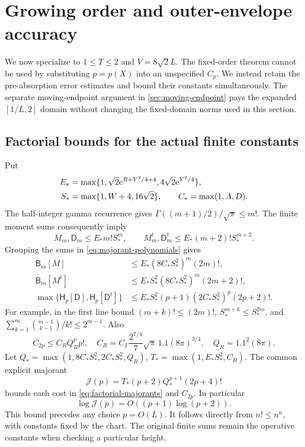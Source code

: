 \section{Growing order and outer-envelope accuracy}
\label{sec:growing}
We now specialize to \(1\le T\le2\) and
\(V=8\sqrt2L\). The fixed-order theorem cannot be used by
substituting \(p=p(X)\) into an unspecified \(C_p\).
We instead retain the pre-absorption error estimates and bound
their constants simultaneously. The separate moving-endpoint argument in
\cref{sec:moving-endpoint} pays the expanded \([1/L,2]\) domain without
changing the fixed-domain norms used in this section.

\subsection{Factorial bounds for the actual finite constants}
Put
\begin{align}
 E_*&=\max\{1,\sqrt2\mathrm e^{R+Y^2/4+4},
                         4\sqrt2\mathrm e^{Y^2/4}\},\\
 S_*&=\max\{1,W+4,16\sqrt2\},\qquad C_*=\max(1,A,D).
\end{align}
The half-integer gamma recurrence gives
\(\Gamma((m+1)/2)/\sqrt\pi\le m!\).
The finite moment sums consequently imply
\[
 M_m,\mathsf D_m\le E_*m!S_*^m,\qquad
 M_m^t,\mathsf D_m^t\le E_*(m+2)!S_*^{m+2}.
\]
Grouping the sums in \eqref{eq:majorant-polynomials} gives
\begin{subequations}\label{eq:factorial-majorants}
\begin{align}
 \mathsf B_m[M]&\le E_*(8C_*S_*^2)^m(2m)!,\\
 \mathsf B_m[M^t]&\le E_*S_*^2(8C_*S_*^2)^m(2m+2)!,\\
 \max\{\mathsf H_p[\mathsf D],\mathsf H_p[\mathsf D^t]\}
 &\le E_*S_*^2(p+1)(2C_*S_*^2)^p(2p+2)!.
\end{align}
\end{subequations}
For example, in the first line bound
\((m+k)!\le(2m)!\), \(S_*^{m+k}\le S_*^{2m}\),
and \(\sum_{k=1}^m\binom{m-1}{k-1}/k!\le2^{m-1}\).
Also
\begin{equation}
 C_{2p}\le C_RQ_R^p p!,\quad
 C_R=C_\Gamma\frac{2^{7/4}}7\sqrt\pi\,1.1(8\pi)^{3/4},
 \quad Q_R=1.1^2(8\pi).
 \label{eq:rs-factorial}
\end{equation}
Let \(Q_*=\max(1,8C_*S_*^2,2C_*S_*^2,Q_R)\),
\(T_*=\max(1,E_*S_*^2,C_R)\). The common explicit majorant
\[
 \mathcal J(p)=T_*(p+2)Q_*^{p+1}(2p+4)!
\]
bounds each cost in \eqref{eq:factorial-majorants} and \(C_{2p}\).
In particular
\begin{equation}
 \log\mathcal J(p)=O((p+1)\log(p+2)).
 \label{eq:log-growth}
\end{equation}
This bound precedes any choice \(p=O(L)\).
It follows directly from \(n!\le n^n\), with constants fixed
by the chart. The original finite sums remain the operative
constants when checking a particular height.

